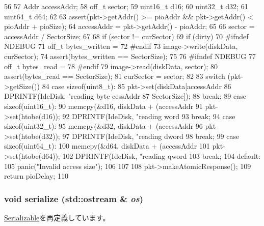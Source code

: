 \begin{DoxyCode}
56 {
57     Addr accessAddr;
58     off_t sector;
59     uint16_t d16;
60     uint32_t d32;
61     uint64_t d64;
62 
63     assert(pkt->getAddr() >= pioAddr && pkt->getAddr() < pioAddr + pioSize);
64     accessAddr = pkt->getAddr() - pioAddr;
65 
66     sector = accessAddr / SectorSize;
67 
68     if (sector != curSector) {
69         if (dirty) {
70 #ifndef NDEBUG
71             off_t bytes_written =
72 #endif
73                 image->write(diskData, curSector);
74             assert(bytes_written == SectorSize);
75         }
76 #ifndef NDEBUG
77         off_t bytes_read =
78 #endif
79             image->read(diskData, sector);
80         assert(bytes_read == SectorSize);
81         curSector = sector;
82     }
83     switch (pkt->getSize()) {
84       case sizeof(uint8_t):
85         pkt->set(diskData[accessAddr %
86         DPRINTF(IdeDisk, "reading byte %
      cessAddr %
87                 SectorSize]);
88         break;
89       case sizeof(uint16_t):
90         memcpy(&d16, diskData + (accessAddr %
91         pkt->set(htobe(d16));
92         DPRINTF(IdeDisk, "reading word %
93         break;
94       case sizeof(uint32_t):
95         memcpy(&d32, diskData + (accessAddr %
96         pkt->set(htobe(d32));
97         DPRINTF(IdeDisk, "reading dword %
98         break;
99       case sizeof(uint64_t):
100         memcpy(&d64, diskData + (accessAddr %
101         pkt->set(htobe(d64));
102         DPRINTF(IdeDisk, "reading qword %
103         break;
104       default:
105         panic("Invalid access size\n");
106     }
107 
108     pkt->makeAtomicResponse();
109     return pioDelay;
110 }
\end{DoxyCode}
\hypertarget{classMmDisk_a53e036786d17361be4c7320d39c99b84}{
\subsubsection[{serialize}]{\setlength{\rightskip}{0pt plus 5cm}void serialize (std::ostream \& {\em os})}}
\label{classMmDisk_a53e036786d17361be4c7320d39c99b84}


\hyperlink{classSerializable_ad6272f80ae37e8331e3969b3f072a801}{Serializable}を再定義しています。


